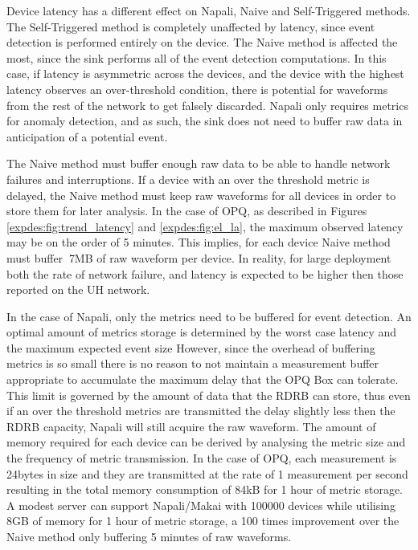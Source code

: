 Device latency has a different effect on Napali, Naive and Self-Triggered methods.
The Self-Triggered method is completely unaffected by latency, since event detection is performed entirely on the device.
The Naive method is affected the most, since the sink performs all of the event detection computations.
In this case, if latency is asymmetric across the devices, and the device with the highest latency observes an over-threshold condition,
there is potential for waveforms from the rest of the network to get falsely discarded.
Napali only requires metrics for anomaly detection, and as such, the sink does not need to buffer raw data in anticipation of a potential event.

The Naive method must buffer enough raw data to be able to handle network failures and interruptions.
If a device with an over the threshold metric is delayed, the Naive method must keep raw waveforms for all devices in order to store them for later analysis.
In the case of OPQ, as described in Figures \ref{expdes:fig:trend_latency} and \ref{expdes:fig:el_la}, the maximum observed latency may be on the order of 5 minutes.
This implies, for each device Naive method must buffer $~$7MB of raw waveform per device.
In reality, for large deployment both the rate of network failure, and latency is expected to be higher then those reported on the UH network.

In the case of Napali, only the metrics need to be buffered for event detection.
An optimal amount of metrics storage is determined by the worst case latency and the maximum expected event size
However, since the overhead of buffering metrics is so small there is no reason to not maintain a measurement buffer appropriate to accumulate the maximum delay that the OPQ Box can tolerate.
This limit is governed by the amount of data that the RDRB can store, thus even if an over the threshold metrics are transmitted the delay slightly less then the RDRB capacity, Napali will still acquire the raw waveform.
The amount of memory required for each device can be derived by analysing the metric size and the frequency of metric transmission.
In the case of OPQ, each measurement is 24bytes in size and they are transmitted at the rate of 1 measurement per second resulting in the total memory consumption of 84kB for 1 hour of metric storage.
A modest server can support Napali/Makai with 100000 devices while utilising 8GB of memory for 1 hour of metric storage, a 100 times improvement over the Naive method only buffering 5 minutes of raw waveforms.

